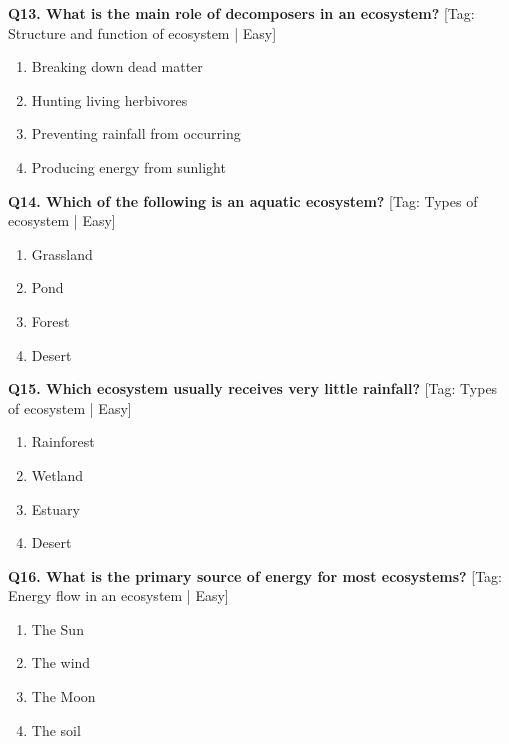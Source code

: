 \noindent\textbf{Q13. What is the main role of decomposers in an ecosystem?} \hfill [Tag: Structure and function of ecosystem | Easy]
\begin{enumerate}[label=(\alph*),topsep=2pt,itemsep=1pt,partopsep=0pt,parsep=0pt]
    \item {Breaking down dead matter}
    \item {Hunting living herbivores}
    \item {Preventing rainfall from occurring}
    \item {Producing energy from sunlight}
\end{enumerate}
\vspace{2mm}

\noindent\textbf{Q14. Which of the following is an aquatic ecosystem?} \hfill [Tag: Types of ecosystem | Easy]
\begin{enumerate}[label=(\alph*),topsep=2pt,itemsep=1pt,partopsep=0pt,parsep=0pt]
    \item {Grassland}
    \item {Pond}
    \item {Forest}
    \item {Desert}
\end{enumerate}
\vspace{2mm}

\noindent\textbf{Q15. Which ecosystem usually receives very little rainfall?} \hfill [Tag: Types of ecosystem | Easy]
\begin{enumerate}[label=(\alph*),topsep=2pt,itemsep=1pt,partopsep=0pt,parsep=0pt]
    \item {Rainforest}
    \item {Wetland}
    \item {Estuary}
    \item {Desert}
\end{enumerate}
\vspace{2mm}

\noindent\textbf{Q16. What is the primary source of energy for most ecosystems?} \hfill [Tag: Energy flow in an ecosystem | Easy]
\begin{enumerate}[label=(\alph*),topsep=2pt,itemsep=1pt,partopsep=0pt,parsep=0pt]
    \item {The Sun}
    \item {The wind}
    \item {The Moon}
    \item {The soil}
\end{enumerate}
\vspace{2mm}

